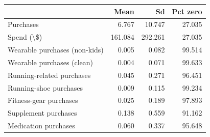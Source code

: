 \begin{tabular}{lrrr}
\toprule
 & Mean & Sd & Pct zero \\
\midrule
Purchases & 6.767 & 10.747 & 27.035 \\
Spend (\textbackslash \$) & 161.084 & 292.261 & 27.035 \\
Wearable purchases (non-kids) & 0.005 & 0.082 & 99.514 \\
Wearable purchases (clean) & 0.004 & 0.071 & 99.633 \\
Running-related purchases & 0.045 & 0.271 & 96.451 \\
Running-shoe purchases & 0.009 & 0.115 & 99.234 \\
Fitness-gear purchases & 0.025 & 0.189 & 97.893 \\
Supplement purchases & 0.138 & 0.559 & 91.162 \\
Medication purchases & 0.060 & 0.337 & 95.648 \\
\bottomrule
\end{tabular}
